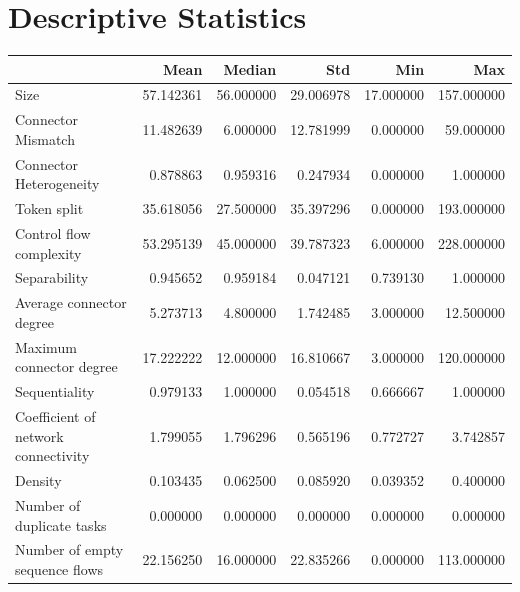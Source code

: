 \documentclass[a4paper]{article}
\begin{document}
\section*{Descriptive Statistics}
\begin{center}
\begin{tabular}{lrrrrr}
\toprule
 & Mean & Median & Std & Min & Max \\
\midrule
Size & 57.142361 & 56.000000 & 29.006978 & 17.000000 & 157.000000 \\
Connector Mismatch & 11.482639 & 6.000000 & 12.781999 & 0.000000 & 59.000000 \\
Connector Heterogeneity & 0.878863 & 0.959316 & 0.247934 & 0.000000 & 1.000000 \\
Token split & 35.618056 & 27.500000 & 35.397296 & 0.000000 & 193.000000 \\
Control flow complexity & 53.295139 & 45.000000 & 39.787323 & 6.000000 & 228.000000 \\
Separability & 0.945652 & 0.959184 & 0.047121 & 0.739130 & 1.000000 \\
Average connector degree & 5.273713 & 4.800000 & 1.742485 & 3.000000 & 12.500000 \\
Maximum connector degree & 17.222222 & 12.000000 & 16.810667 & 3.000000 & 120.000000 \\
Sequentiality & 0.979133 & 1.000000 & 0.054518 & 0.666667 & 1.000000 \\
Coefficient of network connectivity & 1.799055 & 1.796296 & 0.565196 & 0.772727 & 3.742857 \\
Density & 0.103435 & 0.062500 & 0.085920 & 0.039352 & 0.400000 \\
Number of duplicate tasks & 0.000000 & 0.000000 & 0.000000 & 0.000000 & 0.000000 \\
Number of empty sequence flows & 22.156250 & 16.000000 & 22.835266 & 0.000000 & 113.000000 \\
\bottomrule
\end{tabular}
\end{center}
\end{document}
